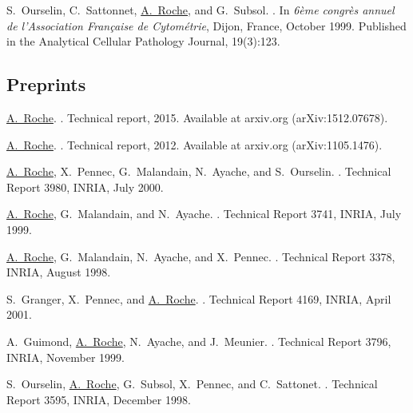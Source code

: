 \begin{thebibliography}{100}
S.~Ourselin, C.~Sattonnet, \underline{A.~Roche}, and G.~Subsol.
.
\newblock In {\em 6\`eme congr\`es annuel de l'Association Fran\c caise de
  Cytom\'etrie}, Dijon, France, October 1999. Published in the Analytical
  Cellular Pathology Journal, 19(3):123.


\subsection*{Preprints}

\underline{A.~Roche}.
.
\newblock Technical report, 2015.
\newblock Available at arxiv.org (arXiv:1512.07678).

\underline{A.~Roche}.
.
\newblock Technical report, 2012.
\newblock Available at arxiv.org (arXiv:1105.1476).

\underline{A.~Roche}, X.~Pennec, G.~Malandain, N.~Ayache, and S.~Ourselin.
.
\newblock Technical Report 3980, INRIA, July 2000.

\underline{A.~Roche}, G.~Malandain, and N.~Ayache.
.
\newblock Technical Report 3741, INRIA, July 1999.

\underline{A.~Roche}, G.~Malandain, N.~Ayache, and X.~Pennec.
.
\newblock Technical Report 3378, INRIA, August 1998.

S.~Granger, X.~Pennec, and \underline{A.~Roche}.
.
\newblock Technical Report 4169, INRIA, April 2001.

A.~Guimond, \underline{A.~Roche}, N.~Ayache, and J.~Meunier.
.
\newblock Technical Report 3796, INRIA, November 1999.

S.~Ourselin, \underline{A.~Roche}, G.~Subsol, X.~Pennec, and C.~Sattonet.
.
\newblock Technical Report 3595, INRIA, December 1998.



\end{thebibliography}
